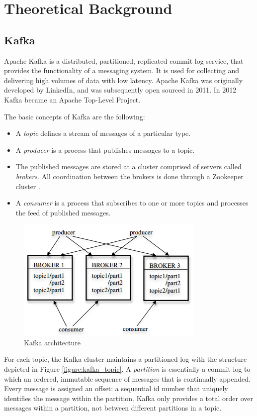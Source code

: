 \chapter{Theoretical Background}\label{chapter:theory}

\section{Kafka}\label{section:theory_kafka}

Apache Kafka \cite{kafka,kafka_documentation} is a distributed, partitioned, replicated commit log service, that provides the functionality of a messaging system. It is used for collecting and delivering high volumes of data with low latency. Apache Kafka was originally developed by LinkedIn, and was subsequently open sourced in 2011. In 2012 Kafka became an Apache Top-Level Project.

The basic concepts of Kafka are the following:
\begin{itemize}
\item A \emph{topic} defines a stream of messages of a particular type.
\item A \emph{producer} is a process that publishes messages to a topic.
\item The published messages are stored at a cluster comprised of servers called \emph{brokers}. All coordination between the brokers is done through a Zookeeper cluster \cite{zookeeper}.
\item A \emph{consumer} is a process that subscribes to one or more topics and processes the feed of published messages.
\end{itemize}

\begin{figure}[h!]
\centering
\includegraphics{figures/kafka_arch}
\caption{Kafka architecture}
\label{figure:kafka_arch}
\end{figure}

For each topic, the Kafka cluster maintains a partitioned log with the structure depicted in Figure \ref{figure:kafka_topic}. A \emph{partition} is essentially a commit log to which an ordered, immutable sequence of messages that is continually appended. Every message is assigned an offset: a sequential id number that uniquely identifies the message within the partition. Kafka only provides a total order over messages within a partition, not between different partitions in a topic.

